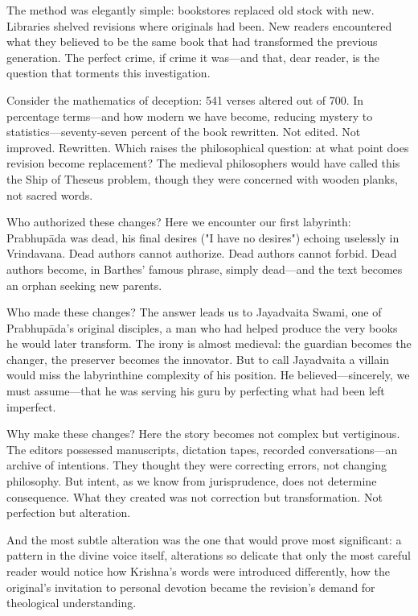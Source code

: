 \documentclass[11pt,twoside]{book}
\begin{document}
The method was elegantly simple: bookstores replaced old stock with new. Libraries shelved revisions where originals had been. New readers encountered what they believed to be the same book that had transformed the previous generation. The perfect crime, if crime it was—and that, dear reader, is the question that torments this investigation.

Consider the mathematics of deception: 541 verses altered out of 700. In percentage terms—and how modern we have become, reducing mystery to statistics—seventy-seven percent of the book rewritten. Not edited. Not improved. Rewritten. Which raises the philosophical question: at what point does revision become replacement? The medieval philosophers would have called this the Ship of Theseus problem, though they were concerned with wooden planks, not sacred words.

Who authorized these changes? Here we encounter our first labyrinth: Prabhupāda was dead, his final desires ("I have no desires") echoing uselessly in Vrindavana. Dead authors cannot authorize. Dead authors cannot forbid. Dead authors become, in Barthes' famous phrase, simply dead—and the text becomes an orphan seeking new parents.

Who made these changes? The answer leads us to Jayadvaita Swami, one of Prabhupāda's original disciples, a man who had helped produce the very books he would later transform. The irony is almost medieval: the guardian becomes the changer, the preserver becomes the innovator. But to call Jayadvaita a villain would miss the labyrinthine complexity of his position. He believed—sincerely, we must assume—that he was serving his guru by perfecting what had been left imperfect.

Why make these changes? Here the story becomes not complex but vertiginous. The editors possessed manuscripts, dictation tapes, recorded conversations—an archive of intentions. They thought they were correcting errors, not changing philosophy. But intent, as we know from jurisprudence, does not determine consequence. What they created was not correction but transformation. Not perfection but alteration.

And the most subtle alteration was the one that would prove most significant: a pattern in the divine voice itself, alterations so delicate that only the most careful reader would notice how Krishna's words were introduced differently, how the original's invitation to personal devotion became the revision's demand for theological understanding.
\end{document}

